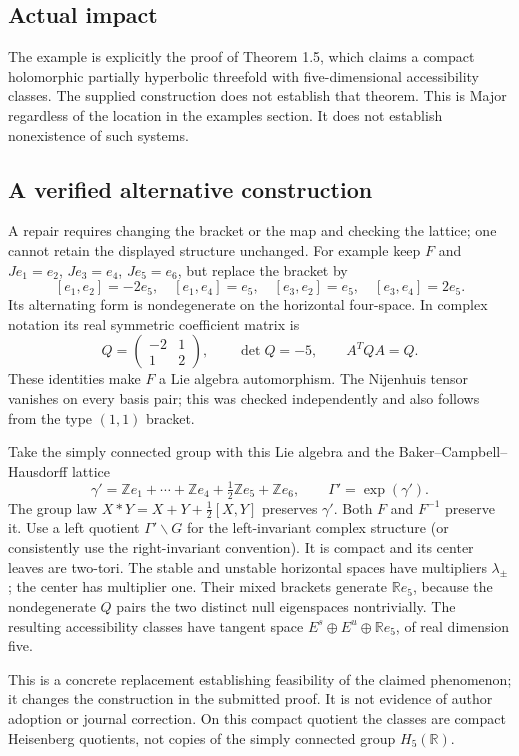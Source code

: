 \documentclass[10pt]{article}
\begin{document}
\subsection*{Actual impact}
The example is explicitly the proof of Theorem 1.5, which claims a compact holomorphic partially hyperbolic threefold with five-dimensional accessibility classes. The supplied construction does not establish that theorem. This is Major regardless of the location in the examples section. It does not establish nonexistence of such systems.\par
\subsection*{A verified alternative construction}
A repair requires changing the bracket or the map and checking the lattice; one cannot retain the displayed structure unchanged. For example keep \(F\) and \(Je_1=e_2\), \(Je_3=e_4\), \(Je_5=e_6\), but replace the bracket by \[[e_1,e_2]=-2e_5,\quad [e_1,e_4]=e_5,\quad
 [e_3,e_2]=e_5,\quad [e_3,e_4]=2e_5.\] Its alternating form is nondegenerate on the horizontal four-space. In complex notation its real symmetric coefficient matrix is \[Q=\begin{pmatrix}-2&1\\1&2\end{pmatrix},\qquad
 \det Q=-5,\qquad A^TQA=Q.\] These identities make \(F\) a Lie algebra automorphism. The Nijenhuis tensor vanishes on every basis pair; this was checked independently and also follows from the type \((1,1)\) bracket.\par
Take the simply connected group with this Lie algebra and the Baker–Campbell–Hausdorff lattice \[\gamma'=\mathbb Z e_1+\cdots+\mathbb Z e_4
             +\tfrac12\mathbb Z e_5+\mathbb Z e_6,\qquad
 \Gamma'=\exp(\gamma').\] The group law \(X*Y=X+Y+\tfrac12[X,Y]\) preserves \(\gamma'\). Both \(F\) and \(F^{-1}\) preserve it. Use a left quotient \(\Gamma'\backslash G\) for the left-invariant complex structure (or consistently use the right-invariant convention). It is compact and its center leaves are two-tori. The stable and unstable horizontal spaces have multipliers \(\lambda_\pm\); the center has multiplier one. Their mixed brackets generate \(\mathbb R e_5\), because the nondegenerate \(Q\) pairs the two distinct null eigenspaces nontrivially. The resulting accessibility classes have tangent space \(E^s\oplus E^u\oplus\mathbb R e_5\), of real dimension five.\par
This is a concrete replacement establishing feasibility of the claimed phenomenon; it changes the construction in the submitted proof. It is not evidence of author adoption or journal correction. On this compact quotient the classes are compact Heisenberg quotients, not copies of the simply connected group \(H_5(\mathbb R)\).\par
\end{document}
